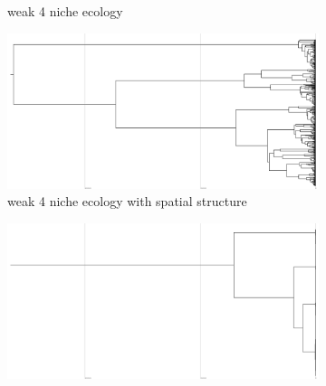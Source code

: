 \begin{figure}
\begin{subfigure}[b]{0.5\columnwidth}
    \caption{%
      weak 4 niche ecology}
  \end{subfigure}
  \hfill
  \begin{subfigure}[b]{0.5\columnwidth}
      \includegraphics[height=0.12\textheight,width=\textwidth]{img/perfect-tree-phylogenies-log/epoch=7+resolution=3+treatment=24/a=collapsed-phylogeny+epoch=00007+mut_distn=np.random.standard_normal+num_generations=32768+num_islands=1024+num_niches=4+p_island_migration=0.01+p_niche_invasion=3.0517578125e-06+population_size=3276.../8+replicate=0+tournament_size=2+treatment=24+_generation=262144+_index=24+scale=nonlog+ext=.pdf}    %
    \caption{%
      weak 4 niche ecology with spatial structure }
  \end{subfigure}
  \hfill
  \begin{subfigure}[b]{0.5\columnwidth}
    \includegraphics[height=0.12\textheight,width=\textwidth]{img/perfect-tree-phylogenies-log/epoch=7+resolution=3+treatment=10/a=collapsed-phylogeny+epoch=00007+mut_distn=np.random.standard_normal+num_generations=32768+num_islands=1+num_niches=4+p_island_migration=0.01+p_niche_invasion=3.0517578125e-08+population_size=32768+r.../eplicate=0+tournament_size=2+treatment=10+_generation=262144+_index=10+scale=nonlog+ext=.pdf}

\end{subfigure}
\end{figure}
